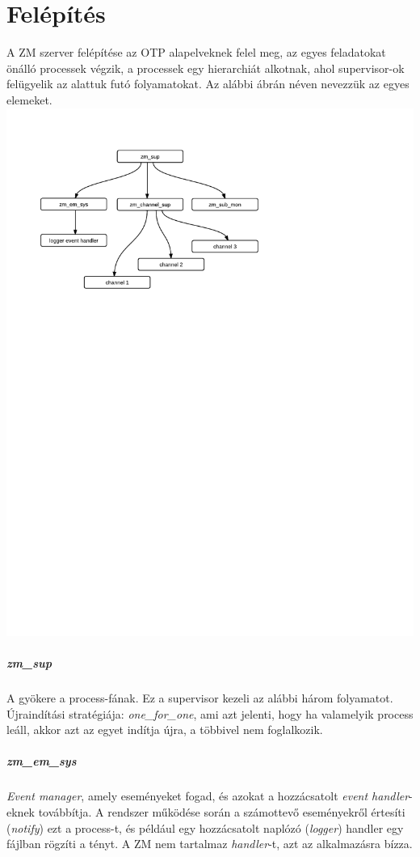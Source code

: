 \documentclass[12pt, a4paper, oneside]{book}
\begin{document}
\section{Felépítés}
A ZM szerver felépítése az OTP alapelveknek felel meg, az egyes feladatokat
önálló processek végzik, a processek egy hierarchiát alkotnak, ahol
supervisor-ok felügyelik az alattuk futó folyamatokat. Az alábbi ábrán néven
nevezzük az egyes elemeket.
\includegraphics[clip=true, trim= 0 18cm 0 1cm]{fig/ZmSup.pdf}

\subparagraph{zm\_sup} A gyökere a process-fának. Ez a supervisor kezeli az
alábbi három folyamatot. Újraindítási stratégiája: \emph{one\_for\_one}, ami
azt jelenti, hogy ha valamelyik process leáll, akkor azt az egyet indítja újra,
a többivel nem foglalkozik.

\subparagraph{zm\_em\_sys} \emph{Event manager}, amely eseményeket fogad,
és azokat a hozzácsatolt \emph{event handler}-eknek továbbítja. A rendszer
működése során a számottevő eseményekről értesíti (\emph{notify}) ezt a
process-t, és például egy hozzácsatolt naplózó (\emph{logger}) handler egy
fájlban rögzíti a tényt. A ZM nem tartalmaz \emph{handler}-t, azt az
alkalmazásra bízza.
\end{document}
